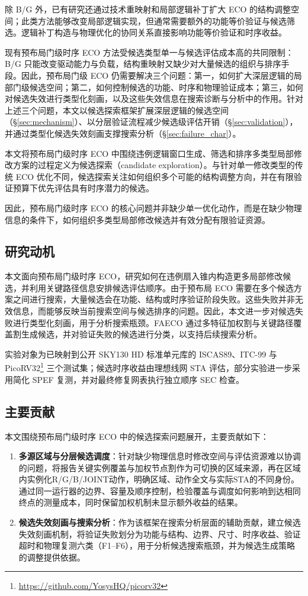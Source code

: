 \documentclass[twocolumn,10pt,fontset=windows]{ctexart}
\begin{document}
除 B/G 外，已有研究还通过技术重映射和局部逻辑补丁扩大 ECO 的结构调整空间；此类方法能够改变局部逻辑实现，但通常需要额外的功能等价验证与候选筛选。逻辑补丁构造与物理优化的协同关系直接影响功能等价验证和时序收益。

现有预布局门级时序 ECO 方法受候选类型单一与候选评估成本高的共同限制：B/G 只能改变驱动能力与负载，结构重映射又缺少对大量候选的组织与排序手段。因此，预布局门级 ECO 仍需要解决三个问题：第一，如何扩大深层逻辑的局部门级候选空间；第二，如何控制候选的功能、时序和物理验证成本；第三，如何对候选失效进行类型化刻画，以及这些失效信息在搜索诊断与分析中的作用。针对上述三个问题，本文以候选探索框架扩展深层逻辑的候选空间（\S\ref{sec:mechanism}）、以分层验证流程减少候选级评估开销（\S\ref{sec:validation}），并通过类型化候选失效刻画支撑搜索分析（\S\ref{sec:failure_char}）。

本文将预布局门级时序 ECO 中围绕违例逻辑窗口生成、筛选和排序多类型局部修改方案的过程定义为候选探索（candidate exploration）。与针对单一修改类型的传统 ECO 优化不同，候选探索关注如何组织多个可能的结构调整方向，并在有限验证预算下优先评估具有时序潜力的候选。

因此，预布局门级时序 ECO 的核心问题并非缺少单一优化动作，而是在缺少物理信息的条件下，如何组织多类型局部修改候选并有效分配有限验证资源。

\subsection{研究动机}
本文面向预布局门级时序 ECO，研究如何在违例扇入锥内构造更多局部修改候选，并利用关键路径信息安排候选评估顺序。由于预布局 ECO 需要在多个候选方案之间进行搜索，大量候选会在功能、结构或时序验证阶段失败。这些失败并非无效信息，而能够反映当前搜索空间与候选排序的问题。因此，本文进一步对候选失败进行类型化刻画，用于分析搜索瓶颈。FAECO 通过多特征加权割与关键路径覆盖割生成候选，并对验证失败的候选进行分类，以支持后续搜索分析。

实验对象为已映射到公开 SKY130 HD 标准单元库的 ISCAS89\cite{iscas89}、ITC-99\cite{itc99} 与 PicoRV32\footnote{\url{https://github.com/YosysHQ/picorv32}} 三个测试集；候选时序收益由理想线网 STA 评估，部分实验进一步采用简化 SPEF 复测，并对最终修复网表执行独立顺序 SEC 检查。

\subsection{主要贡献}
本文围绕预布局门级时序 ECO 中的候选探索问题展开，主要贡献如下：

\begin{enumerate}
  \item \textbf{多源区域与分层候选调度}：针对缺少物理信息时修改空间与评估资源难以协调的问题，将报告关键实例覆盖与加权节点割作为可切换的区域来源，再在区域内实例化R/G/B/JOINT动作，明确区域、动作全文与实际STA的不同身份。通过同一运行器的边界、容量及顺序控制，检验覆盖与调度如何影响到达相同终点的测量成本，同时保留加权机制未显示额外收益的结果。
  \item \textbf{候选失效刻画与搜索分析}：作为该框架在搜索分析层面的辅助贡献，建立候选失效刻画机制，将验证失败划分为功能与结构、边界、尺寸、时序收益、验证超时和物理复测六类（F1--F6），用于分析候选搜索瓶颈，并为候选生成策略的调整提供依据。
\end{enumerate}
\end{document}
